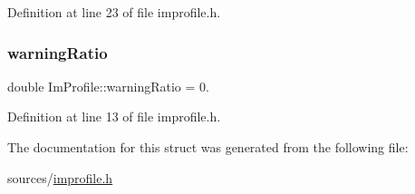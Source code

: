 Definition at line 23 of file improfile.\+h.

\mbox{\label{struct_im_profile_a3f88e1cfa11d6b5e9472eb71e64dc041}} 
\subsubsection{\texorpdfstring{warning\+Ratio}{warningRatio}}
{\footnotesize\ttfamily double Im\+Profile\+::warning\+Ratio = 0.}



Definition at line 13 of file improfile.\+h.



The documentation for this struct was generated from the following file\+:\begin{DoxyCompactItemize}
\item 
sources/\mbox{\hyperlink{improfile_8h}{improfile.\+h}}\end{DoxyCompactItemize}
